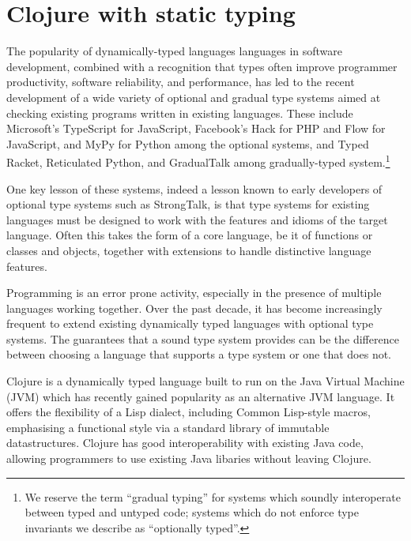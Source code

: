\section{Clojure with static typing}


The popularity of dynamically-typed languages languages in software
development, combined with a recognition that types often improve
programmer productivity, software reliability, and performance, has
led to the recent development of a wide variety of optional and
gradual type systems aimed at checking existing programs written in
existing languages.  These include Microsoft's TypeScript for
JavaScript, Facebook's Hack for PHP and Flow for JavaScript, and MyPy
for Python among the optional systems, and Typed Racket, Reticulated
Python, and GradualTalk among gradually-typed system.\footnote{We
  reserve the term ``gradual typing'' for systems which soundly
  interoperate between typed and untyped code; systems which do not
  enforce type invariants we describe as ``optionally typed''.}

One key lesson of these systems, indeed a lesson known to early
developers of optional type systems such as StrongTalk, is that type
systems for existing languages must be designed to work with the
features and idioms of the target language. Often this takes the form
of a core language, be it of functions or classes and objects,
together with extensions to handle distinctive language features.


Programming is an error prone activity, especially in the presence of
multiple languages working together. Over the past decade, it has become increasingly
frequent to extend existing dynamically typed languages with optional type systems.
The guarantees that a sound type system provides can be the difference between
choosing a language that supports a type system or one that does not.


Clojure is a dynamically typed language built to run on the Java Virtual Machine (JVM)
which has recently gained popularity as an alternative JVM language.
It offers the flexibility of a Lisp dialect, including Common Lisp-style macros,
emphasising a functional style via a standard library of immutable datastructures. 
Clojure has good interoperability with existing Java code, allowing programmers to
use existing Java libaries without leaving Clojure.

